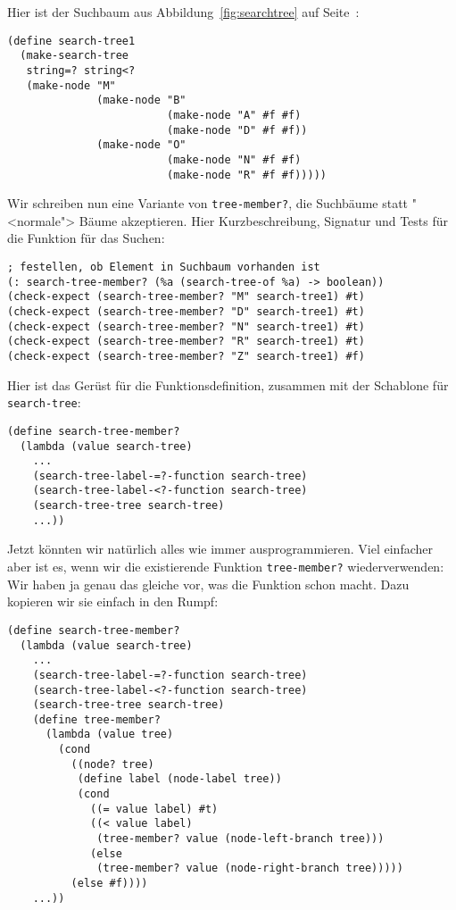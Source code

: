 Hier ist der Suchbaum aus Abbildung~\ref{fig:searchtree} auf
Seite~\pageref{fig:searchtree}:
%
\begin{lstlisting}
(define search-tree1
  (make-search-tree
   string=? string<?
   (make-node "M"
              (make-node "B"
                         (make-node "A" #f #f)
                         (make-node "D" #f #f))
              (make-node "O"
                         (make-node "N" #f #f)
                         (make-node "R" #f #f)))))
\end{lstlisting}
%
Wir schreiben nun eine Variante von \lstinline{tree-member?},
die Suchbäume statt "<normale"> Bäume
akzeptieren.  Hier Kurzbeschreibung, Signatur und Tests für die
Funktion für das Suchen:\label{func:search-tree-member}
%
\begin{lstlisting}
; festellen, ob Element in Suchbaum vorhanden ist
(: search-tree-member? (%a (search-tree-of %a) -> boolean))
(check-expect (search-tree-member? "M" search-tree1) #t)
(check-expect (search-tree-member? "D" search-tree1) #t)
(check-expect (search-tree-member? "N" search-tree1) #t)
(check-expect (search-tree-member? "R" search-tree1) #t)
(check-expect (search-tree-member? "Z" search-tree1) #f)
\end{lstlisting}
%
Hier ist das Gerüst für die Funktionsdefinition, zusammen mit der
Schablone für \lstinline{search-tree}:
%
\begin{lstlisting}
(define search-tree-member?
  (lambda (value search-tree)
    ...
    (search-tree-label-=?-function search-tree)
    (search-tree-label-<?-function search-tree)
    (search-tree-tree search-tree)
    ...))
\end{lstlisting}
%
Jetzt könnten wir natürlich alles wie immer ausprogrammieren.  Viel
einfacher aber ist es, wenn wir die existierende Funktion
\lstinline{tree-member?} wiederverwenden: Wir haben ja genau das
gleiche vor, was die Funktion schon macht.  Dazu kopieren wir sie
einfach in den Rumpf:
%
\begin{lstlisting}
(define search-tree-member?
  (lambda (value search-tree)
    ...
    (search-tree-label-=?-function search-tree)
    (search-tree-label-<?-function search-tree)
    (search-tree-tree search-tree)
    (define tree-member?
      (lambda (value tree)
        (cond
          ((node? tree)
           (define label (node-label tree))
           (cond
             ((= value label) #t)
             ((< value label)
              (tree-member? value (node-left-branch tree)))
             (else
              (tree-member? value (node-right-branch tree)))))
          (else #f))))
    ...))
\end{lstlisting}
